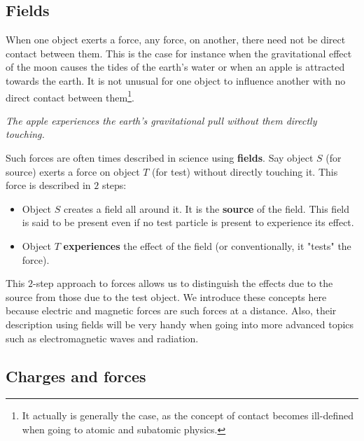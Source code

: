 \subsection{Fields}
\noindent When one object exerts a force, any force, on another, there need not be direct contact between them. This is the case for instance when the gravitational effect of the moon causes the tides of the earth's water or when an apple is attracted towards the earth. It is not unusual for one object to influence another with no direct contact between them\footnote{It actually is generally the case, as the concept of contact becomes ill-defined when going to atomic and subatomic physics.}.
\begin{center}
\end{center}
\begin{center}
\textit{The apple experiences the earth's gravitational pull without them directly touching.}
\end{center}
\noindent Such forces are often times described in science using \textbf{fields}. Say object $S$ (for source) exerts a force on object $T$ (for test) without directly touching it. This force is described in $2$ steps:
\begin{itemize}
\item Object $S$ creates a field all around it. It is the \textbf{source} of the field. This field is said to be present even if no test particle is present to experience its effect.
\item Object $T$ \textbf{experiences} the effect of the field (or conventionally, it "tests" the force). 
\end{itemize}
\noindent This $2$-step approach to forces allows us to distinguish the effects due to the source from those due to the test object. We introduce these concepts here because electric and magnetic forces are such forces at a distance. Also, their description using fields will be very handy when going into more advanced topics such as electromagnetic waves and radiation.\\

\subsection{Charges and forces}

